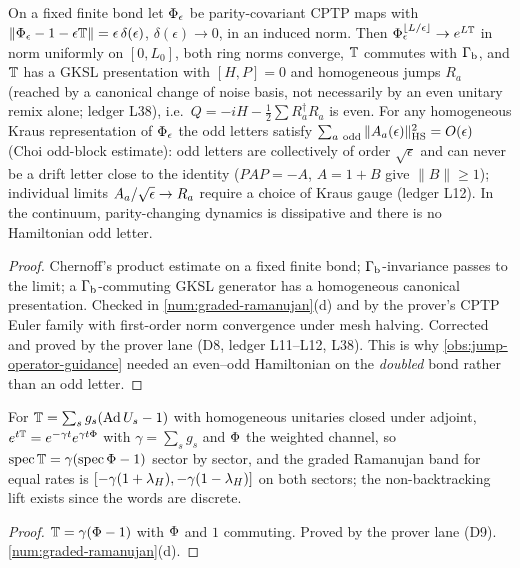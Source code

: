 \begin{proposition}
\label{prop:graded-chernoff}
On a fixed finite bond let $\Phi_\epsilon$ be parity-covariant CPTP maps with $\|\Phi_\epsilon-1-
\epsilon\mathbb T\| = \epsilon\,\delta(\epsilon)$, $\delta(\epsilon)\to0$, in an induced norm. Then
$\Phi_\epsilon^{\lfloor L/\epsilon\rfloor}\to e^{L\mathbb T}$ in norm uniformly on $[0,L_0]$, both ring
norms converge, $\mathbb T$ commutes with $\Gamma_{\mathrm b}$, and $\mathbb T$ has a GKSL presentation with $[H,P] = 0$ and
homogeneous jumps $R_a$ (reached by a canonical change of noise basis, not necessarily by an even
unitary remix alone; ledger L38), i.e.\ $Q = -iH-\tfrac12\sum R_a^\dagger R_a$ is even. For any
homogeneous Kraus representation of $\Phi_\epsilon$ the odd letters satisfy
$\sum_{a\ \mathrm{odd}}\|\Kr{a}(\epsilon)\|_{\mathrm{HS}}^2 = O(\epsilon)$ (Choi odd-block estimate): odd
letters are collectively of order $\sqrt\epsilon$ and can never be a drift letter close to the
identity ($PAP = -A$, $A = 1+B$ give $\|B\|\ge1$); individual limits $A_{a}/\sqrt\epsilon\to R_a$
require a choice of Kraus gauge (ledger L12). In the continuum, parity-changing dynamics is
dissipative and there is no Hamiltonian odd letter.
\end{proposition}
\begin{proof}
Chernoff's product estimate on a fixed finite bond; $\Gamma_{\mathrm b}$-invariance passes to the limit; a
$\Gamma_{\mathrm b}$-commuting GKSL generator has a homogeneous canonical presentation. Checked in
\cref{num:graded-ramanujan}(d) and by the prover's CPTP Euler family with first-order norm
convergence under mesh halving. Corrected and proved by the prover lane (D8, ledger L11--L12,
L38). This is why \cref{obs:jump-operator-guidance} needed an even--odd Hamiltonian on the
\emph{doubled} bond rather than an odd letter.
\end{proof}

\begin{proposition}
\label{prop:jump-lindbladian-band}
For $\mathbb T = \sum_sg_s(\operatorname{Ad} U_s-1)$ with homogeneous unitaries closed under adjoint, $e^{t\mathbb T} =
e^{-\gamma t}e^{\gamma t\Phi}$ with $\gamma = \sum_sg_s$ and $\Phi$ the weighted channel, so
$\operatorname{spec}\mathbb T = \gamma(\operatorname{spec}\Phi-1)$ sector by sector, and the graded
Ramanujan band for equal rates is $[-\gamma(1+\lambda_H),-\gamma(1-\lambda_H)]$ on both sectors; the
non-backtracking lift exists since the words are discrete.
\end{proposition}
\begin{proof}
$\mathbb T = \gamma(\Phi-1)$ with $\Phi$ and $1$ commuting. Proved by the prover lane (D9).
\cref{num:graded-ramanujan}(d).
\end{proof}

